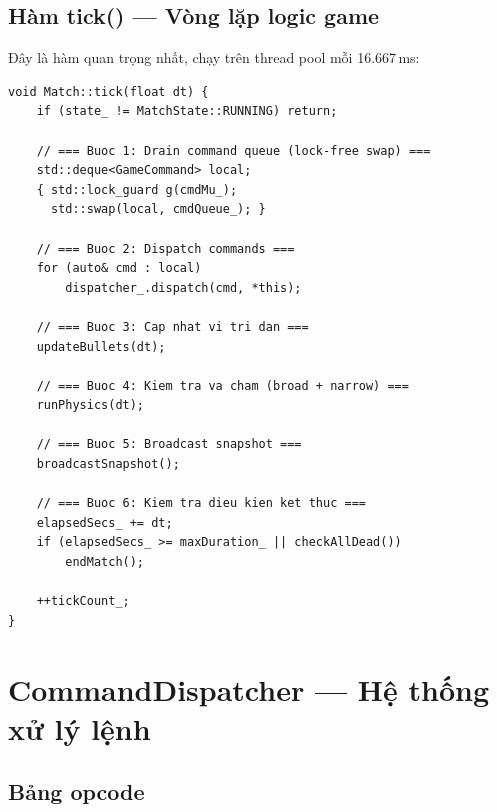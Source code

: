 \documentclass[12pt,a4paper]{report}
\begin{document}
\subsection{Hàm tick() --- Vòng lặp logic game}

Đây là hàm quan trọng nhất, chạy trên thread pool mỗi 16.667\,ms:

\begin{lstlisting}[style=cppStyle, caption={Hàm tick() của Match --- đầy đủ pipeline}, label={lst:matchtick}]
void Match::tick(float dt) {
    if (state_ != MatchState::RUNNING) return;

    // === Buoc 1: Drain command queue (lock-free swap) ===
    std::deque<GameCommand> local;
    { std::lock_guard g(cmdMu_);
      std::swap(local, cmdQueue_); }

    // === Buoc 2: Dispatch commands ===
    for (auto& cmd : local)
        dispatcher_.dispatch(cmd, *this);

    // === Buoc 3: Cap nhat vi tri dan ===
    updateBullets(dt);

    // === Buoc 4: Kiem tra va cham (broad + narrow) ===
    runPhysics(dt);

    // === Buoc 5: Broadcast snapshot ===
    broadcastSnapshot();

    // === Buoc 6: Kiem tra dieu kien ket thuc ===
    elapsedSecs_ += dt;
    if (elapsedSecs_ >= maxDuration_ || checkAllDead())
        endMatch();

    ++tickCount_;
}
\end{lstlisting}

\section{CommandDispatcher --- Hệ thống xử lý lệnh}

\subsection{Bảng opcode}
\end{document}
